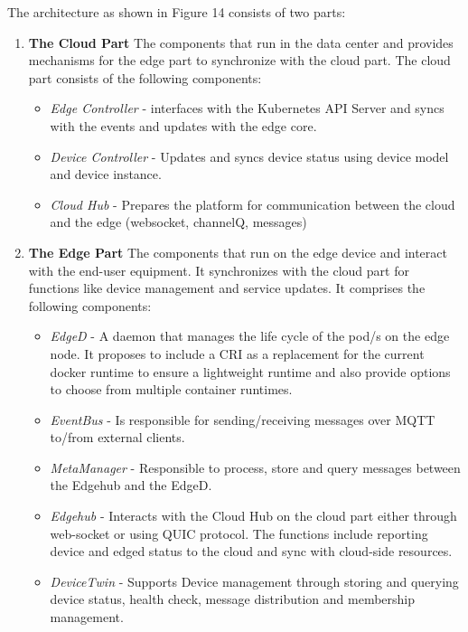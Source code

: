 \begin{flushleft}
The architecture as shown in Figure 14 consists of two parts:
\end{flushleft}
\begin{enumerate}
    \item \textbf{The Cloud Part}
	    The components that run in the data center and provides mechanisms for the edge part to synchronize with the cloud part. The cloud part consists of the following components:
        \begin{itemize}
            \item \textit{Edge Controller} - interfaces with the Kubernetes API Server and syncs with the events and updates with the edge core.
            \item \textit{Device Controller} - Updates and syncs device status using device model and device instance. 
            \item \textit{Cloud Hub} - Prepares the platform for communication between the cloud and the edge (websocket, channelQ, messages)
		\end{itemize}
    \item \textbf{The Edge Part}
        The components that run on the edge device and interact with the end-user equipment. It synchronizes with the cloud part for functions like device management and service updates. It comprises the following components:
		\begin{itemize}
            \item \textit{EdgeD} - A daemon that manages the life cycle of the pod/s on the edge node. It proposes to include a CRI as a replacement for the current docker runtime to ensure a lightweight runtime and also provide options to choose from multiple container runtimes.
            \item \textit{EventBus} - Is responsible for sending/receiving messages over MQTT to/from external clients.
            \item \textit{MetaManager} - Responsible to process, store and query messages between the Edgehub and the EdgeD. 
            \item \textit{Edgehub} - Interacts with the Cloud Hub on the cloud part either through web-socket or using QUIC protocol. The functions include reporting device and edged status to the cloud and sync with cloud-side resources.
            \item \textit{DeviceTwin} - Supports Device management through storing and querying device status, health check, message distribution and membership management.
	    \end{itemize}
\end{enumerate}
